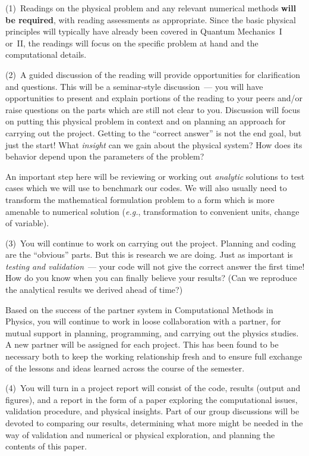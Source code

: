 \documentclass[12pt]{mcplain}
\begin{document}
\begin{leftindent}

  (1)~Readings on the physical problem and any relevant numerical methods
  \textbf{will be required}, with reading assessments as appropriate.  Since
  the basic physical principles will typically have already been covered in
  Quantum Mechanics~I or~II, the readings will focus on the specific problem at
  hand and the computational details.

  (2)~A guided discussion of the reading will provide opportunities for
  clarification and questions.  This will be a seminar-style discussion~--- you
  will have opportunities to present and explain portions of the reading to your
  peers and/or raise questions on the parts which are still not clear to you.
  Discussion will focus on putting this physical problem in context and on
  planning an approach for carrying out the project.  Getting to the ``correct
  answer'' is not the end goal, but just the start!  What \textit{insight} can
  we gain about the physical system?  How does its behavior depend upon the
  parameters of the problem?

  An important step here will be reviewing or working out \textit{analytic}
  solutions to test cases which we will use to benchmark our codes.  We will
  also usually need to transform the mathematical formulation problem to a form
  which is more amenable to numerical solution (\textit{e.g.}, transformation to
  convenient units, change of variable).

  (3)~You will continue to work on carrying out the project. Planning and coding
  are the ``obvious'' parts.  But this is research we are doing.  Just as
  important is \textit{testing and validation}~--- your code will not give the
  correct answer the first time!  How do you know when you can finally believe
  your results?  (Can we reproduce the analytical results we derived ahead of
  time?)

  Based on the success of the partner system in Computational Methods in
  Physics, you will continue to work in loose collaboration with a partner, for
  mutual support in planning, programming, and carrying out the physics studies.
  A new partner will be assigned for each project.  This has been found to be
  necessary both to keep the working relationship fresh and to ensure full
  exchange of the lessons and ideas learned across the course of the semester.

  (4)~You will turn in a  project report will consist of the code, results
  (output and figures), and a report in the form of a paper exploring the
  computational issues, validation procedure, and physical insights. Part of our
  group discussions will be devoted to comparing our results, determining what
  more might be needed in the way of validation and numerical or physical
  exploration, and planning the contents of this paper.


\end{leftindent}
\end{document}
